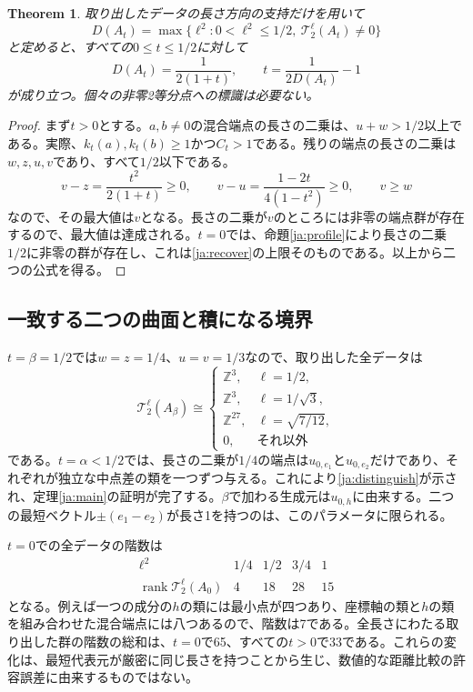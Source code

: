 \documentclass[12pt]{amsart}
\newcommand{\TheoremName}{Theorem}
\newtheorem{thm}{\TheoremName}[section]
\theoremstyle{definition}
\theoremstyle{remark}
\numberwithin{equation}{section}
\newcommand{\rank}{\operatorname{rank}}
\newcommand{\Z}{\mathbb{Z}}
\begin{document}
\begin{thm}\label{ja:reconstruct}
取り出したデータの長さ方向の支持だけを用いて
\begin{equation}\label{ja:recover}
D(A_t)=\max\{\ell^2:0<\ell^2\leq1/2,
\ \mathcal T_2^\ell(A_t)\ne0\}
\end{equation}
と定めると、すべての$0\leq t\leq1/2$に対して
\begin{equation}\label{ja:recoverformula}
D(A_t)=\frac1{2(1+t)},\qquad
t=\frac1{2D(A_t)}-1
\end{equation}
が成り立つ。個々の非零2等分点への標識は必要ない。
\end{thm}
\begin{proof}
まず$t>0$とする。$a,b\ne0$の混合端点の長さの二乗は、$u+w>1/2$以上である。実際、$k_t(a),k_t(b)\geq1$かつ$C_t>1$である。残りの端点の長さの二乗は$w,z,u,v$であり、すべて$1/2$以下である。
\[
v-z=\frac{t^2}{2(1+t)}\geq0,\qquad
v-u=\frac{1-2t}{4(1-t^2)}\geq0,\qquad v\geq w
\]
なので、その最大値は$v$となる。長さの二乗が$v$のところには非零の端点群が存在するので、最大値は達成される。$t=0$では、命題\ref{ja:profile}により長さの二乗$1/2$に非零の群が存在し、これは\eqref{ja:recover}の上限そのものである。以上から二つの公式を得る。
\end{proof}

\subsection{一致する二つの曲面と積になる境界}
$t=\beta=1/2$では$w=z=1/4$、$u=v=1/3$なので、取り出した全データは
\begin{equation}\label{ja:betaprofile}
\mathcal T_2^\ell(A_\beta)\cong
\begin{cases}
\Z^3,&\ell=1/2,\\
\Z^3,&\ell=1/\sqrt3,\\
\Z^{27},&\ell=\sqrt{7/12},\\
0,&\text{それ以外}
\end{cases}
\end{equation}
である。$t=\alpha<1/2$では、長さの二乗が$1/4$の端点は$u_{0,e_1}$と$u_{0,e_2}$だけであり、それぞれが独立な中点差の類を一つずつ与える。これにより\eqref{ja:distinguish}が示され、定理\ref{ja:main}の証明が完了する。$\beta$で加わる生成元は$u_{0,h}$に由来する。二つの最短ベクトル$\pm(e_1-e_2)$が長さ1を持つのは、このパラメータに限られる。

$t=0$での全データの階数は
\begin{equation}\label{ja:zeroprofile}
\begin{array}{c|cccc}
\ell^2&1/4&1/2&3/4&1\\\hline
\rank\mathcal T_2^\ell(A_0)&4&18&28&15
\end{array}
\end{equation}
となる。例えば一つの成分の$h$の類には最小点が四つあり、座標軸の類と$h$の類を組み合わせた混合端点には八つあるので、階数は7である。全長さにわたる取り出した群の階数の総和は、$t=0$で65、すべての$t>0$で33である。これらの変化は、最短代表元が厳密に同じ長さを持つことから生じ、数値的な距離比較の許容誤差に由来するものではない。
\end{document}
